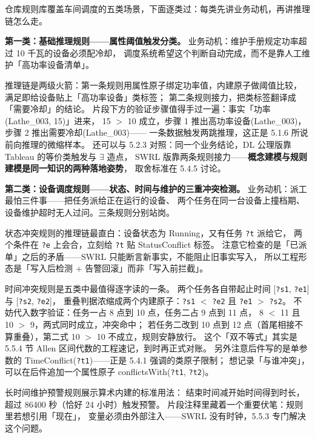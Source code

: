 仓库规则库覆盖车间调度的五类场景，下面逐类过：每类先讲业务动机，再讲推理链怎么走。

\textbf{第一类：基础推理规则——属性阈值触发分类。}
业务动机：维护手册规定功率超过 10 千瓦的设备必须配冷却，
调度系统希望这个判断自动完成，而不是靠人工维护「高功率设备清单」。



推理链是两级火箭：第一条规则用属性原子绑定功率值，内建原子做阈值比较，
满足即给设备贴上「高功率设备」类标签；
第二条规则接力，把类标签翻译成「需要冷却」的结论。
片段下方的验证步骤值得手过一遍：事实「功率(Lathe\_003, 15)」进来，
15 \(>\) 10 成立，步骤 1 推出高功率设备(Lathe\_003)，步骤 2 推出需要冷却(Lathe\_003)——
一条数据触发两跳推理，这正是 5.1.6 所说前向推理的微缩样本。
还可以与 5.2.3 对照：同一个业务结论，DL 公理版靠 Tableau 的等价类触发与 \(\exists\) 造点，
SWRL 版靠两条规则接力——\textbf{概念建模与规则建模是同一知识的两种落地姿势}，
取舍标准在 5.4.5 讨论。

\textbf{第二类：设备调度规则——状态、时间与维护的三重冲突检测。}
业务动机：派工最怕三件事——把任务派给正在运行的设备、
两个任务在同一台设备上撞档期、设备维护超时无人过问。三条规则分别站岗。



状态冲突规则的推理链最直白：设备状态为 Running，又有任务 \texttt{?t} 派给它，
两个条件在 \texttt{?e} 上会合，立刻给 \texttt{?t} 贴 StatusConflict 标签。
注意它检查的是「已派单」之后的矛盾——SWRL 只能断言新事实，不能阻止旧事实写入，
所以工程形态是「写入后检测 + 告警回滚」而非「写入前拦截」。

时间冲突规则是五类中最值得逐字读的一条。
两个任务各自带起止时间 [\texttt{?s1}, \texttt{?e1}] 与 [\texttt{?s2}, \texttt{?e2}]，
重叠判据浓缩成两个内建原子：\texttt{?s1} \(<\) \texttt{?e2} 且 \texttt{?e1} \(>\) \texttt{?s2}。
不妨代入数字验证：任务一占 8 点到 10 点，任务二占 9 点到 11 点，
8 \(<\) 11 且 10 \(>\) 9，两式同时成立，冲突命中；
若任务二改到 10 点到 12 点（首尾相接不算重叠），第二式 10 \(>\) 10 不成立，规则安静放行。
这个「双不等式」其实是 5.5.4 节 Allen 区间代数的工程速记，到时再正式对账。
另外注意后件写的是单参数的 TimeConflict(\texttt{?t1})——正是 5.4.1 强调的类原子限制；
想记录「与谁冲突」，可以在后件追加一个属性原子 conflictsWith(\texttt{?t1}, \texttt{?t2})。

长时间维护预警规则展示算术内建的标准用法：
结束时间减开始时间得到时长，超过 86400 秒（恰好 24 小时）触发预警。
片段注释里藏着一个重要伏笔：规则里若想引用「现在」，
变量必须由外部注入——SWRL 没有时钟，5.5.3 专门解决这个问题。

